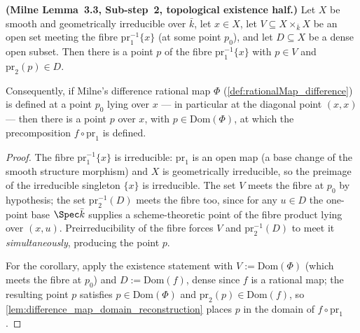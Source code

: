 \begin{lemma}
  \label{lem:milne33_slice_existence}

  \textbf{(Milne Lemma~3.3, Sub-step~2, topological existence half.)} Let \(X\) be
  smooth and geometrically irreducible over \(\bar k\), let \(x \in X\), let
  \(V \subseteq X \times_{\bar k} X\) be an open set meeting the fibre
  \(\mathrm{pr}_1^{-1}\{x\}\) (at some point \(p_0\)), and let \(D \subseteq X\) be a
  dense open subset. Then there is a point \(p\) of the fibre
  \(\mathrm{pr}_1^{-1}\{x\}\) with \(p \in V\) and \(\mathrm{pr}_2(p) \in D\).

  Consequently, if Milne's difference rational map \(\Phi\)
  (\cref{def:rationalMap_difference}) is defined at a point \(p_0\) lying over
  \(x\) --- in particular at the diagonal point \((x, x)\) --- then there is a
  point \(p\) over \(x\), with \(p \in \mathrm{Dom}(\Phi)\), at which the
  precomposition \(f \circ \mathrm{pr}_1\) is defined.
\end{lemma}
\begin{proof}\leanok
  The fibre \(\mathrm{pr}_1^{-1}\{x\}\) is irreducible: \(\mathrm{pr}_1\) is an
  open map (a base change of the smooth structure morphism) and \(X\) is
  geometrically irreducible, so the preimage of the irreducible singleton
  \(\{x\}\) is irreducible. The set \(V\) meets the fibre at \(p_0\) by
  hypothesis; the set \(\mathrm{pr}_2^{-1}(D)\) meets the fibre too, since for
  any \(u \in D\) the one-point base \(\Spec \bar k\) supplies a
  scheme-theoretic point of the fibre product lying over \((x, u)\).
  Preirreducibility of the fibre forces \(V\) and \(\mathrm{pr}_2^{-1}(D)\) to
  meet it \emph{simultaneously}, producing the point \(p\).

  For the corollary, apply the existence statement with \(V := \mathrm{Dom}(\Phi)\)
  (which meets the fibre at \(p_0\)) and \(D := \mathrm{Dom}(f)\), dense since
  \(f\) is a rational map; the resulting point \(p\) satisfies
  \(p \in \mathrm{Dom}(\Phi)\) and \(\mathrm{pr}_2(p) \in \mathrm{Dom}(f)\), so
  \cref{lem:difference_map_domain_reconstruction} places \(p\) in the domain of
  \(f \circ \mathrm{pr}_1\).
\end{proof}

